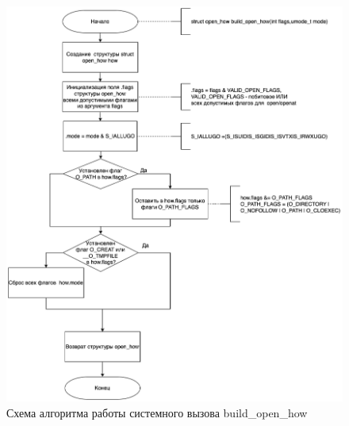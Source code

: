 \documentclass[12pt]{report}
\begin{document}
\begin{figure}[h!]
	\centering
	\includegraphics[scale=0.5]{build_open_how.png}
	\caption{Схема алгоритма работы системного вызова build\_open\_how}
	\label{png:testing:result}
\end{figure}
\end{document}
